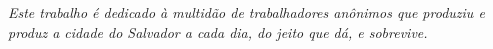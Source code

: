 \begin{dedicatoria}
   \vspace*{\fill}
   \centering
   \noindent
   \textit{Este trabalho é dedicado à multidão de trabalhadores anônimos que produziu e produz a cidade do Salvador a cada dia, do jeito que dá, e sobrevive.} \vspace*{\fill}
\end{dedicatoria}
